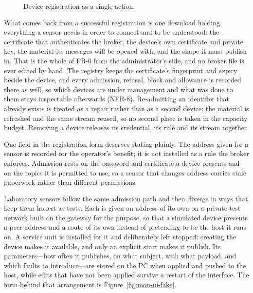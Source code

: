 \documentclass[12pt,a4paper]{report}
\begin{document}
\begin{figure}[htbp]
{%
}
\caption{Device registration as a single action.}
\label{fig:mon-onboard}
\end{figure}

What comes back from a successful registration is one download holding
everything a sensor needs in order to connect and to be understood: the
certificate that authenticates the broker, the device's own certificate
and private key, the material its messages will be opened with, and the
shape it must publish in. That is the whole of FR-6 from the
administrator's side, and no broker file is ever edited by hand. The
registry keeps the certificate's fingerprint and expiry beside the
device, and every admission, refusal, block and allowance is recorded
there as well, so which devices are under management and what was done
to them stays inspectable afterwards (NFR-8). Re-admitting an identifier
that already exists is treated as a repair rather than as a second
device: the material is refreshed and the same stream reused, so no
second place is taken in the capacity budget. Removing a device releases
its credential, its rule and its stream together.

One field in the registration form deserves stating plainly. The
address given for a sensor is recorded for the operator's benefit; it
is not installed as a rule the broker enforces. Admission rests on the
password and certificate a device presents and on the topics it is
permitted to use, so a sensor that changes address carries stale
paperwork rather than different permissions.

Laboratory sensors follow the same admission path and then diverge in
ways that keep them honest as tests. Each is given an address of its
own on a private test network built on the gateway for the purpose, so
that a simulated device presents a peer address and a route of its own
instead of pretending to be the host it runs on. A service unit is
installed for it and deliberately left stopped: creating the device
makes it available, and only an explicit start makes it publish. Its
parameters---how often it publishes, on what subject, with what payload,
and which faults to introduce---are stored on the PC when applied and
pushed to the host, while edits that have not been applied survive a
restart of the interface. The form behind that arrangement is
Figure~\ref{fig:mon-ui-fake}.
\end{document}
